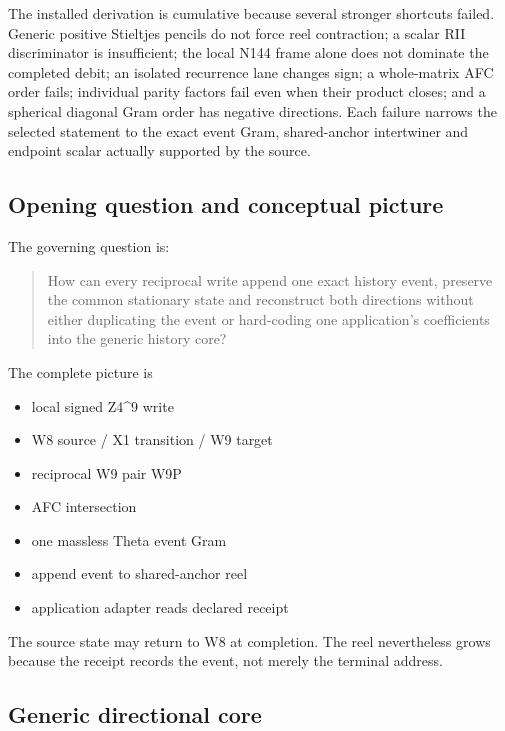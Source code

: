 The installed derivation is cumulative because several stronger
shortcuts failed. Generic positive Stieltjes pencils do not force reel
contraction; a scalar RII discriminator is insufficient; the local N144
frame alone does not dominate the completed debit; an isolated
recurrence lane changes sign; a whole-matrix AFC order fails; individual
parity factors fail even when their product closes; and a spherical
diagonal Gram order has negative directions. Each failure narrows the
selected statement to the exact event Gram, shared-anchor intertwiner
and endpoint scalar actually supported by the source.

\subsection{Opening question and conceptual
picture}\label{viii-ch06-opening-question-and-conceptual-picture}

The governing question is:

\begin{quote}
How can every reciprocal write append one exact history event, preserve
the common stationary state and reconstruct both directions without
either duplicating the event or hard-coding one application's
coefficients into the generic history core?
\end{quote}

The complete picture is

\begin{itemize}
\tightlist
\item
  local signed Z4\^{}9 write
\item
  W8 source / X1 transition / W9 target
\item
  reciprocal W9 pair W9P
\item
  AFC intersection
\item
  one massless Theta event Gram
\item
  append event to shared-anchor reel
\item
  application adapter reads declared receipt
\end{itemize}

The source state may return to W8 at completion. The reel nevertheless
grows because the receipt records the event, not merely the terminal
address.

\subsection{Generic directional core}\label{viii-ch06-generic-directional-core}

